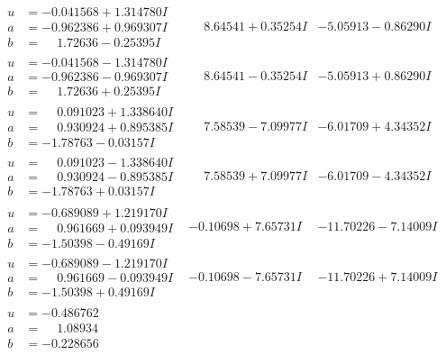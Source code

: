 \documentclass[1p]{elsarticle_modified}
\theoremstyle{definition}
\begin{document}
$$\begin{array}{c|c|c}
\begin{aligned}
u &= -0.041568 + 1.314780 I \\
a &= -0.962386 + 0.969307 I \\
b &= \phantom{-}1.72636 - 0.25395 I\end{aligned}
 & \phantom{-}8.64541 + 0.35254 I & -5.05913 - 0.86290 I \\ \hline\begin{aligned}
u &= -0.041568 - 1.314780 I \\
a &= -0.962386 - 0.969307 I \\
b &= \phantom{-}1.72636 + 0.25395 I\end{aligned}
 & \phantom{-}8.64541 - 0.35254 I & -5.05913 + 0.86290 I \\ \hline\begin{aligned}
u &= \phantom{-}0.091023 + 1.338640 I \\
a &= \phantom{-}0.930924 + 0.895385 I \\
b &= -1.78763 - 0.03157 I\end{aligned}
 & \phantom{-}7.58539 - 7.09977 I & -6.01709 + 4.34352 I \\ \hline\begin{aligned}
u &= \phantom{-}0.091023 - 1.338640 I \\
a &= \phantom{-}0.930924 - 0.895385 I \\
b &= -1.78763 + 0.03157 I\end{aligned}
 & \phantom{-}7.58539 + 7.09977 I & -6.01709 - 4.34352 I \\ \hline\begin{aligned}
u &= -0.689089 + 1.219170 I \\
a &= \phantom{-}0.961669 + 0.093949 I \\
b &= -1.50398 - 0.49169 I\end{aligned}
 & -0.10698 + 7.65731 I & -11.70226 - 7.14009 I \\ \hline\begin{aligned}
u &= -0.689089 - 1.219170 I \\
a &= \phantom{-}0.961669 - 0.093949 I \\
b &= -1.50398 + 0.49169 I\end{aligned}
 & -0.10698 - 7.65731 I & -11.70226 + 7.14009 I \\ \hline\begin{aligned}
u &= -0.486762\phantom{ +0.000000I} \\
a &= \phantom{-}1.08934\phantom{ +0.000000I} \\
b &= -0.228656\phantom{ +0.000000I}\end{aligned}

\end{array}$$
\end{document}
